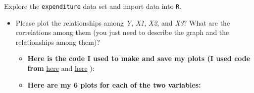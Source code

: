 \documentclass[12pt,letterpaper]{article}
\begin{document}
\vspace{.5cm}
\noindent Explore the \texttt{expenditure} data set and import data into \texttt{R}.
\vspace{.5cm}
  
\vspace{.5cm}
\begin{itemize}

\item
Please plot the relationships among \emph{Y}, \emph{X1}, \emph{X2}, and \emph{X3}? What are the correlations among them (you just need to describe the graph and the relationships among them)?
	\begin{itemize}
	\item \textbf{Here is the code I used to make and save my plots (I used code from}
	\href{https://thomasleeper.com/Rcourse/Tutorials/plotcolors.html}{here} and \href{https://bookdown.org/ndphillips/YaRrr/saving-plots-to-a-file-with-pdf-jpeg-and-png.html}{here} ):
	
	 
	
	\item \textbf{Here are my 6 plots for each of the two variables:}
	

\end{itemize}
\end{itemize}
\end{document}
